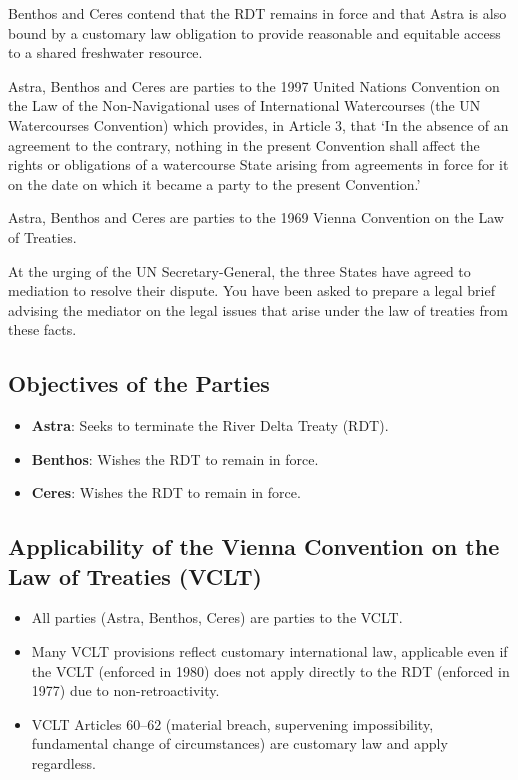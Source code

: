 \begin{tutorialquestion}
    \vspace{\baselineskip}

    Benthos and Ceres contend that the RDT remains in force and that Astra is also bound by a customary law obligation to provide reasonable and equitable access to a shared freshwater resource.

    \vspace{\baselineskip}

    Astra, Benthos and Ceres are parties to the 1997 United Nations Convention on the Law of the Non-Navigational uses of International Watercourses (the UN Watercourses Convention) which provides, in Article 3, that `In the absence of an agreement to the contrary, nothing in the present Convention shall affect the rights or obligations of a watercourse State arising from agreements in force for it on the date on which it became a party to the present Convention.'

    \vspace{\baselineskip}

    Astra, Benthos and Ceres are parties to the 1969 Vienna Convention on the Law of Treaties.

    \vspace{\baselineskip}

    At the urging of the UN Secretary-General, the three States have agreed to mediation to resolve their dispute. You have been asked to prepare a legal brief advising the mediator on the legal issues that arise under the law of treaties from these facts.
\end{tutorialquestion}

\subsection{Objectives of the Parties}
\begin{itemize}
    \item \textbf{Astra}: Seeks to terminate the River Delta Treaty (RDT).
    \item \textbf{Benthos}: Wishes the RDT to remain in force.
    \item \textbf{Ceres}: Wishes the RDT to remain in force.
\end{itemize}

\subsection{Applicability of the Vienna Convention on the Law of Treaties (VCLT)}
\begin{itemize}
    \item All parties (Astra, Benthos, Ceres) are parties to the VCLT.
    \item Many VCLT provisions reflect customary international law, applicable even if the VCLT (enforced in 1980) does not apply directly to the RDT (enforced in 1977) due to non-retroactivity.
    \item VCLT Articles 60–62 (material breach, supervening impossibility, fundamental change of circumstances) are customary law and apply regardless.
\end{itemize}


